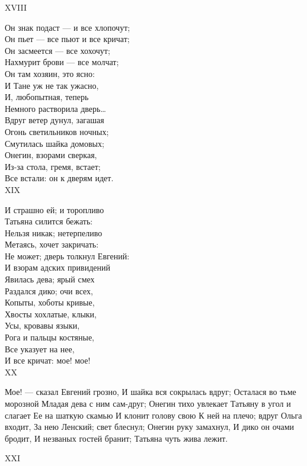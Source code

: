 XVIII

Он знак подаст — и все хлопочут;\\
Он пьет — все пьют и все кричат;\\
Он засмеется — все хохочут;\\
Нахмурит брови — все молчат;\\
Он там хозяин, это ясно:\\
И Тане уж не так ужасно,\\
И, любопытная, теперь\\
Немного растворила дверь…\\
Вдруг ветер дунул, загашая\\
Огонь светильников ночных;\\
Смутилась шайка домовых;\\
Онегин, взорами сверкая,\\
Из-за стола, гремя, встает;\\
Все встали: он к дверям идет.\\

XIX

И страшно ей; и торопливо\\
Татьяна силится бежать:\\
Нельзя никак; нетерпеливо\\
Метаясь, хочет закричать:\\
Не может; дверь толкнул Евгений:\\
И взорам адских привидений\\
Явилась дева; ярый смех\\
Раздался дико; очи всех,\\
Копыты, хоботы кривые,\\
Хвосты хохлатые, клыки,\\
Усы, кровавы языки,\\
Рога и пальцы костяные,\\
Все указует на нее,\\
И все кричат: мое! мое!\\

XX

Мое! — сказал Евгений грозно,
И шайка вся сокрылась вдруг;
Осталася во тьме морозной
Младая дева с ним сам-друг;
Онегин тихо увлекает
Татьяну в угол и слагает
Ее на шаткую скамью
И клонит голову свою
К ней на плечо; вдруг Ольга входит,
За нею Ленский; свет блеснул;
Онегин руку замахнул,
И дико он очами бродит,
И незваных гостей бранит;
Татьяна чуть жива лежит.

XXI

